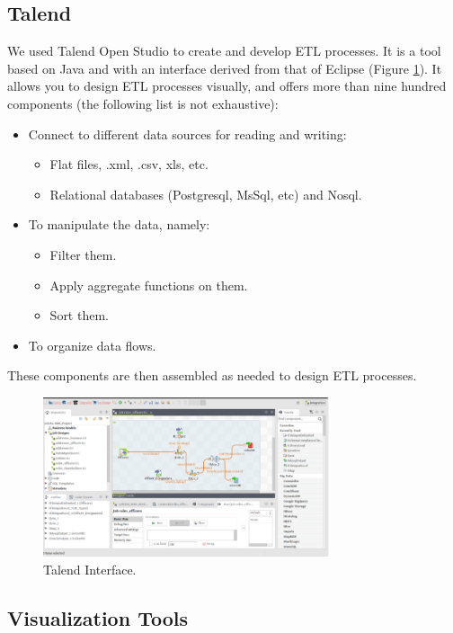 \subsection{Talend}
\label{sec:talend}
We used  Talend Open Studio to create and develop ETL processes. It is a tool based on Java and with an interface derived from that of Eclipse (Figure \ref{fig:Talend}). It allows you to design ETL processes visually, and offers more than nine hundred components (the following list is not exhaustive)\cite{TalendOpenStudio}: 
\begin{itemize}
\renewcommand{\labelitemi}{$\bullet$}
\item Connect to different data sources for reading and writing:
\begin{itemize}
\item Flat files, .xml, .\gls{csv}, \gls{xls}, etc.
\item Relational databases (Postgresql, MsSql, etc) and Nosql.
\end{itemize}
\item To manipulate the data, namely:
\begin{itemize}
\item Filter them.
\item Apply aggregate functions on them.
\item Sort them.
\end{itemize}
\item To organize data flows.
\end{itemize}
These components are then assembled as needed to design ETL processes\cite{mehdiPfe}.
\begin{figure}[h!]
    \center
    \includegraphics[width=0.75\textwidth]{images/chapter4/talendInterface.png}
    \caption{Talend Interface.}
    \label{fig:Talend}
\end{figure}
\newpage

\subsection{Visualization Tools}

